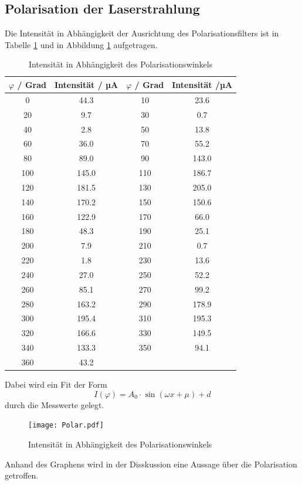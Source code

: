 \subsection{Polarisation der Laserstrahlung}
Die Intensität in Abhängigkeit der Ausrichtung des Polarisationsfilters ist in Tabelle \ref{tab:Pol} und in Abbildung \ref{fig:Pol} aufgetragen.
\begin{table}
  \centering
  \caption{Intensität in Abhängigkeit des Polarisationswinkels}
  \begin{tabular}{c c | c c}
    \toprule
    $\varphi$ / Grad & Intensität / µA & $\varphi$ / Grad & Intensität /µA \\
    \midrule
	0	& 44.3	& 10	& 23.6	\\
	20	& 9.7	& 30	& 0.7	\\
	40	& 2.8	& 50	& 13.8	\\
	60	& 36.0	& 70	& 55.2	\\
	80	& 89.0	& 90	& 143.0	\\
	100	& 145.0	& 110	& 186.7	\\
	120	& 181.5	& 130	& 205.0	\\
	140	& 170.2	& 150	& 150.6	\\
	160	& 122.9	& 170	& 66.0	\\
	180	& 48.3	& 190	& 25.1	\\
	200	& 7.9	& 210	& 0.7	\\
	220	& 1.8	& 230	& 13.6	\\
	240	& 27.0	& 250	& 52.2	\\
	260	& 85.1	& 270	& 99.2	\\
	280	& 163.2	& 290	& 178.9	\\
	300	& 195.4	& 310	& 195.3	\\
	320	& 166.6	& 330	& 149.5	\\
	340	& 133.3 & 350	& 94.1	\\
	360	& 43.2	\\
    \bottomrule
  \end{tabular}
  \label{tab:Pol}
\end{table}
Dabei wird ein Fit der Form
\begin{equation}
  I(\varphi) = A_0 \cdot \sin(\omega x + \mu) + d
  \label{eqn:pfit}
\end{equation}
durch die Messwerte gelegt.
\begin{figure}
  \centering
  \texttt{[image: Polar.pdf]}
  \caption{Intensität in Abhängigkeit des Polarisationswinkels}
  \label{fig:Pol}
\end{figure}
Anhand des Graphens wird in der Disskussion eine Aussage über die Polarisation getroffen.
